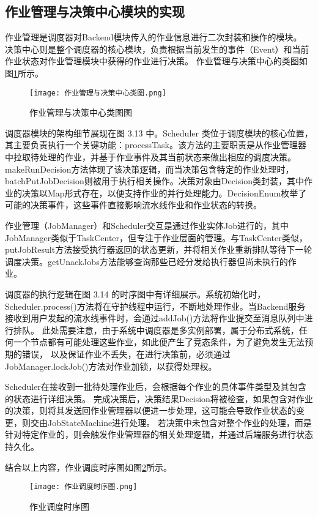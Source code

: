 
\subsection{作业管理与决策中心模块的实现}

作业管理是调度器对Backend模块传入的作业信息进行二次封装和操作的模块。
决策中心则是整个调度器的核心模块，负责根据当前发生的事件（Event）和当前作业状态对作业管理模块中获得的作业进行决策。
作业管理与决策中心的类图如图\ref{fig:作业管理与决策中心类图}所示。

\begin{figure}[h]
  \centering
  \texttt{[image: 作业管理与决策中心类图.png]}
  \caption{作业管理与决策中心类图图}
  \label{fig:作业管理与决策中心类图}
\end{figure}

调度器模块的架构细节展现在图 3.13 中。Scheduler 类位于调度模块的核心位置，其主要负责执行一个关键功能：processTask。该方法的主要职责是从作业管理器中拉取待处理的作业，并基于作业事件及其当前状态来做出相应的调度决策。makeRunDecision方法体现了该决策逻辑，而当决策包含特定的作业处理时，batchPutJobDecision则被用于执行相关操作。决策对象由Decision类封装，其中作业的决策以Map形式存在，以便支持作业的并行处理能力。DecisionEnum枚举了可能的决策事件，这些事件直接影响流水线作业和作业状态的转换。

作业管理（JobManager）和Scheduler交互是通过作业实体Job进行的，其中JobManager类似于TaskCenter，但专注于作业层面的管理。与TaskCenter类似，putJobResult方法接受执行器返回的状态更新，并将相关作业重新排队等待下一轮调度决策。getUnackJobs方法能够查询那些已经分发给执行器但尚未执行的作业。

调度器的执行逻辑在图 3.14 的时序图中有详细展示。系统初始化时，Scheduler.process()方法将在守护线程中运行，不断地处理作业。当Backend服务接收到用户发起的流水线事件时，会通过addJob()方法将作业提交至消息队列中进行排队。
此处需要注意，由于系统中调度器是多实例部署，属于分布式系统，任何一个节点都有可能处理这些作业，如此便产生了竞态条件，为了避免发生无法预期的错误，
以及保证作业不丢失，在进行决策前，必须通过JobManager.lockJob()方法对作业加锁，以获得处理权。

Scheduler在接收到一批待处理作业后，会根据每个作业的具体事件类型及其包含的状态进行详细决策。
完成决策后，决策结果Decision将被检查，如果包含对作业的决策，则将其发送回作业管理器以便进一步处理，这可能会导致作业状态的变更，则交由JobStateMachine进行处理。
若决策中未包含对整个作业的处理，而是针对特定作业的，则会触发作业管理器的相关处理逻辑，并通过后端服务进行状态持久化。

结合以上内容，作业调度时序图如图\ref{fig:作业调度时序图}所示。

\begin{figure}[h]
  \centering
  \texttt{[image: 作业调度时序图.png]}
  \caption{作业调度时序图}
  \label{fig:作业调度时序图}
\end{figure}

